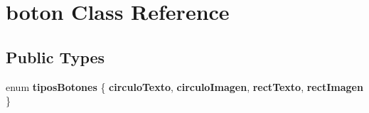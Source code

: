 \hypertarget{classboton}{}\section{boton Class Reference}
\label{classboton}
\subsection*{Public Types}
\begin{DoxyCompactItemize}
\item 
\hypertarget{classboton_a62def824d19d57b2180e1539e573f906}{}enum {\bfseries tipos\+Botones} \{ {\bfseries circulo\+Texto}, 
{\bfseries circulo\+Imagen}, 
{\bfseries rect\+Texto}, 
{\bfseries rect\+Imagen}
 \}\label{classboton_a62def824d19d57b2180e1539e573f906}

\end{DoxyCompactItemize}

